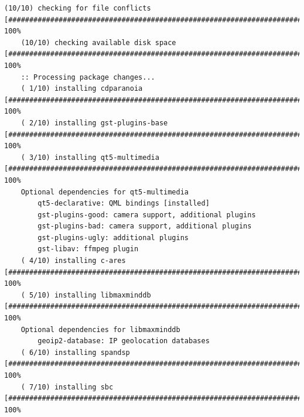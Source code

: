 \begin{Verbatim}[frame=single,breaklines=true,breakanywhere=true]
    (10/10) checking for file conflicts                                                                                                            [########################################################################################] 100%
    (10/10) checking available disk space                                                                                                          [########################################################################################] 100%
    :: Processing package changes...
    ( 1/10) installing cdparanoia                                                                                                                  [########################################################################################] 100%
    ( 2/10) installing gst-plugins-base                                                                                                            [########################################################################################] 100%
    ( 3/10) installing qt5-multimedia                                                                                                              [########################################################################################] 100%
    Optional dependencies for qt5-multimedia
        qt5-declarative: QML bindings [installed]
        gst-plugins-good: camera support, additional plugins
        gst-plugins-bad: camera support, additional plugins
        gst-plugins-ugly: additional plugins
        gst-libav: ffmpeg plugin
    ( 4/10) installing c-ares                                                                                                                      [########################################################################################] 100%
    ( 5/10) installing libmaxminddb                                                                                                                [########################################################################################] 100%
    Optional dependencies for libmaxminddb
        geoip2-database: IP geolocation databases
    ( 6/10) installing spandsp                                                                                                                     [########################################################################################] 100%
    ( 7/10) installing sbc                                                                                                                         [########################################################################################] 100%

\end{Verbatim}
